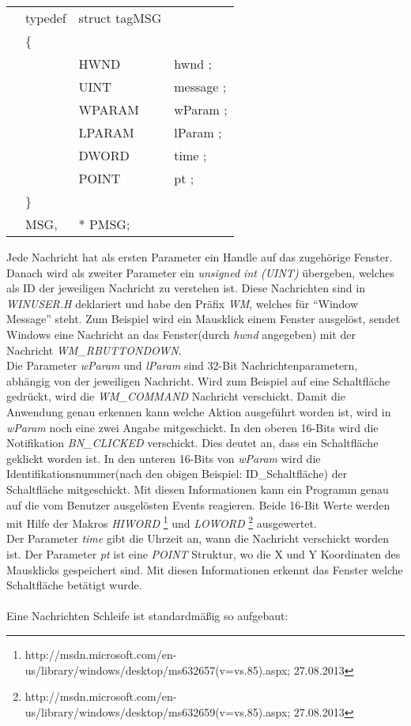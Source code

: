 \begin{tabular}{llll}
& typedef & struct tagMSG\\
& \{\\
&  & HWND   & hwnd ;\\
&  & UINT   & message ;\\
&  & WPARAM & wParam ;\\
&  & LPARAM & lParam ;\\
&  & DWORD  & time ;\\
&  & POINT  & pt ;\\
& \}\\
& MSG,&* PMSG;\\
\end{tabular}

Jede Nachricht hat als ersten Parameter ein Handle auf das zugehörige Fenster. Danach wird als zweiter Parameter ein \textit{unsigned int (UINT)} übergeben, welches als ID der jeweiligen Nachricht zu verstehen ist. Diese Nachrichten sind in \textit{WINUSER.H} deklariert und habe den Präfix \textit{WM}, welches für "`Window Message"' steht. Zum Beispiel wird ein Mausklick einem Fenster ausgelöst, sendet Windows eine Nachricht an das Fenster(durch \textit{hwnd} angegeben) mit der Nachricht \textit{WM\_RBUTTONDOWN}.\\

Die Parameter \textit{wParam} und \textit{lParam} sind 32-Bit Nachrichtenparametern, abhängig von der jeweiligen Nachricht. Wird zum Beispiel auf eine Schaltfläche gedrückt, wird die \textit{WM\_COMMAND} Nachricht verschickt. Damit die Anwendung genau erkennen kann welche Aktion ausgeführt worden ist, wird in \textit{wParam} noch eine zwei Angabe mitgeschickt. In den oberen 16-Bits wird die Notifikation \textit{BN\_CLICKED} verschickt. Dies deutet an, dass ein Schaltfläche geklickt worden ist. In den unteren 16-Bits von \textit{wParam} wird die Identifikationsnummer(nach den obigen Beispiel: ID\_Schaltfläche) der Schaltfläche mitgeschickt. Mit diesen Informationen kann ein Programm genau auf die vom Benutzer ausgelösten Events reagieren. Beide 16-Bit Werte werden mit Hilfe der Makros \textit{HIWORD} \footnote{http://msdn.microsoft.com/en-us/library/windows/desktop/ms632657(v=vs.85).aspx; 27.08.2013} und \textit{LOWORD} \footnote{http://msdn.microsoft.com/en-us/library/windows/desktop/ms632659(v=vs.85).aspx; 27.08.2013} ausgewertet.\\

Der Parameter \textit{time} gibt die Uhrzeit an, wann die Nachricht verschickt worden ist. Der Parameter \textit{pt} ist eine \textit{POINT} Struktur, wo die X und Y Koordinaten des Mausklicks gespeichert sind. Mit diesen Informationen erkennt das Fenster welche Schaltfläche betätigt wurde.
\\\\
Eine Nachrichten Schleife ist standardmäßig so aufgebaut:

